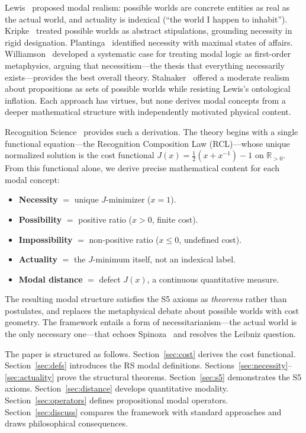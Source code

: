 \documentclass[12pt,a4paper]{article}
\theoremstyle{definition}
\theoremstyle{remark}
\begin{document}
Lewis~\cite{Lewis1986} proposed modal realism: possible worlds are
concrete entities as real as the actual world, and actuality is indexical
(``the world I happen to inhabit'').  Kripke~\cite{Kripke1980} treated
possible worlds as abstract stipulations, grounding necessity in rigid
designation.  Plantinga~\cite{Plantinga1974} identified necessity with
maximal states of affairs.  Williamson~\cite{Williamson2013} developed a
systematic case for treating modal logic as first-order metaphysics,
arguing that necessitism---the thesis that everything necessarily
exists---provides the best overall theory.
Stalnaker~\cite{Stalnaker2012} offered a moderate realism about
propositions as sets of possible worlds while resisting Lewis's
ontological inflation.  Each approach has virtues, but none derives modal
concepts from a deeper mathematical structure with independently
motivated physical content.

Recognition Science~\cite{RS_Axioms} provides such a derivation.
The theory begins with a single functional equation---the Recognition
Composition Law (RCL)---whose unique normalized solution is the cost
functional
$J(x) = \tfrac{1}{2}(x + x^{-1}) - 1$ on $\mathbb{R}_{>0}$.  From
this functional alone, we derive precise mathematical content for each
modal concept:

\begin{itemize}[nosep]
  \item \textbf{Necessity} $=$ unique $J$-minimizer ($x = 1$).
  \item \textbf{Possibility} $=$ positive ratio ($x > 0$, finite cost).
  \item \textbf{Impossibility} $=$ non-positive ratio ($x \leq 0$,
  undefined cost).
  \item \textbf{Actuality} $=$ the $J$-minimum itself, not an indexical label.
  \item \textbf{Modal distance} $=$ defect $J(x)$, a continuous
  quantitative measure.
\end{itemize}

The resulting modal structure satisfies the S5 axioms as \emph{theorems}
rather than postulates, and replaces the metaphysical debate about
possible worlds with cost geometry.  The framework entails a form of
necessitarianism---the actual world is the only necessary one---that
echoes Spinoza~\cite{Spinoza1677} and resolves the Leibniz question.

The paper is structured as follows.  Section~\ref{sec:cost} derives the
cost functional.  Section~\ref{sec:defs} introduces the RS modal
definitions.
Sections~\ref{sec:necessity}--\ref{sec:actuality} prove the structural
theorems.  Section~\ref{sec:s5} demonstrates the S5 axioms.
Section~\ref{sec:distance} develops quantitative modality.
Section~\ref{sec:operators} defines propositional modal operators.
Section~\ref{sec:discuss} compares the framework with standard
approaches and draws philosophical consequences.
\end{document}
